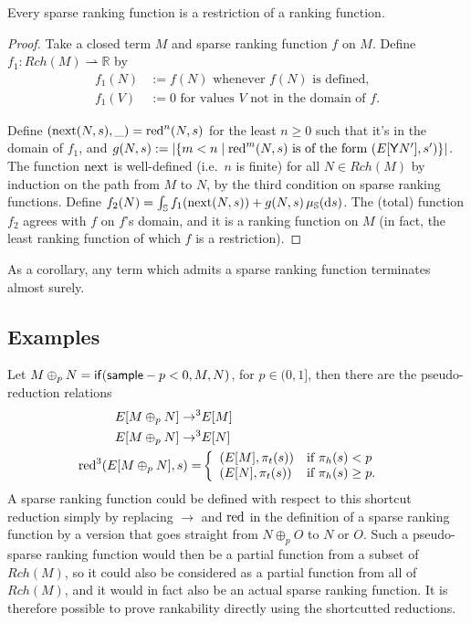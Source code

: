 \begin{theorem} \label{thm:partial implies rankable}
Every sparse ranking function is a restriction of a ranking function.
\end{theorem}
\begin{proof}
Take a closed term $M$ and sparse ranking function $f$ on $M$. Define $f_1 : Rch(M) \rightharpoonup \mathbb R$ by
\begin{align*}
    f_1(N) & := f(N) \text{ whenever $f(N)$ is defined,} \\
    f_1(V) & := 0 \text{ for values $V$ not in the domain of $f$.}
\end{align*}

Define $(\operatorname{next}(N,s),\_) = \operatorname{red}^n(N,s)$ for the least $n \geq 0$ such that it's in the domain of $f_1$, and $g(N,s) := \left | \{m < n \mid \operatorname{red}^m(N,s) \text{ is of the form } (E[\mathsf{Y} N'],s') \} \right |$. 
The function $\operatorname{next}$ is well-defined (i.e.~$n$ is finite) for all $N \in Rch(M)$ by induction on the path from $M$ to $N$, by the third condition on sparse ranking functions. Define $f_2(N) = \int_{\mathbb{S}} f_1(\operatorname{next}(N,s)) + g(N,s) \, \mu_{{\mathbb{S}}}(\mathrm d s)$. The (total) function $f_2$ agrees with $f$ on $f$'s domain, and it is a ranking function on $M$ (in fact, the least ranking function of which $f$ is a restriction).
\end{proof}


As a corollary, any term which admits a sparse ranking function terminates almost surely.

\subsection{Examples}
Let $M \oplus_p N = \mathsf{if}(\mathsf{sample} - p < 0, M, N)$, for $p \in (0,1]$, then there are the pseudo-reduction relations
\begin{align*}
E[M \oplus_p N] \to^3 & E[M] & \\
E[M \oplus_p N] \to^3 & E[N] & \\
\operatorname{red}^3(E[M \oplus_p N], s) = & \left\{
    \begin{array}{ll}
        (E[M],\pi_t(s)) & \text{if } \pi_h(s) < p \\
        (E[N],\pi_t(s)) & \text{if } \pi_h(s) \geq p. \\
    \end{array} \right .
\end{align*}
A sparse ranking function could be defined with respect to this shortcut reduction simply by replacing $\to$ and $\operatorname{red}$ in the definition of a sparse ranking function by a version that goes straight from $N \oplus_p O$ to $N$ or $O$. Such a pseudo-sparse ranking function would then be a partial function from a subset of $Rch(M)$, so it could also be considered as a partial function from all of $Rch(M)$, and it would in fact also be an actual sparse ranking function. It is therefore possible to prove rankability directly using the shortcutted reductions.

